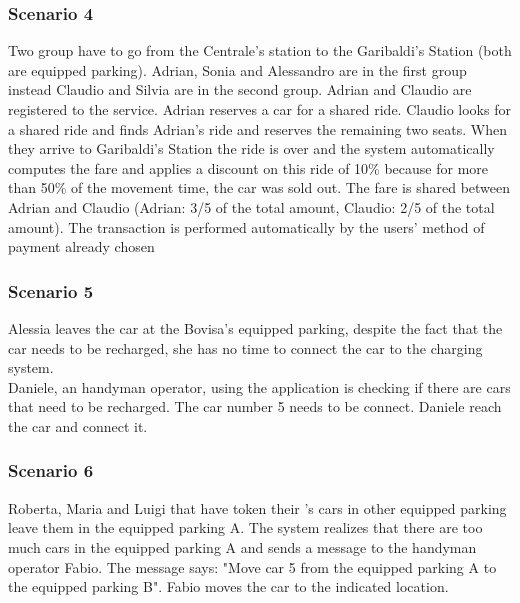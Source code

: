 \subsubsection{Scenario 4}
Two group have to go from the Centrale's station to the Garibaldi's Station (both are equipped parking).
Adrian, Sonia and Alessandro are in the first group instead Claudio and Silvia are in the second group. Adrian and Claudio are registered to the service. Adrian reserves a car for a shared ride. Claudio looks for a shared ride and finds Adrian's ride and reserves the remaining two seats. When they arrive to Garibaldi's Station the ride is over and the system automatically computes the fare and applies a discount on this ride of 10\% because for more than 50\% of the movement time, the car was sold out.
The fare is shared between Adrian and Claudio (Adrian: 3/5 of the total amount, Claudio: 2/5 of the total amount). The transaction is performed automatically by the users' method of payment already chosen
\subsubsection{Scenario 5}
Alessia leaves the car at the Bovisa's equipped parking, despite the fact that the car needs to be recharged, she has no time to connect the car to the charging system. \\
Daniele, an handyman operator, using the \pej application is checking if there are cars that need to be recharged. The car number 5 needs to be connect. Daniele reach the car and connect it.
\subsubsection{Scenario 6}
Roberta, Maria and Luigi that have token their \pej's cars in other equipped parking leave them in the equipped parking A. The system realizes that there are too much cars in the equipped parking A and sends a message to  the handyman operator Fabio. The message says: "Move car 5 from the equipped parking A to the equipped parking B". Fabio moves the car to the indicated location.